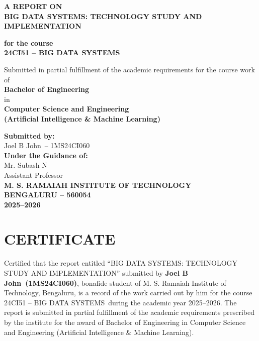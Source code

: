 \documentclass[12pt,a4paper]{report}
\newcommand{\ProjectTitle}{BIG DATA SYSTEMS: TECHNOLOGY STUDY AND IMPLEMENTATION}
\newcommand{\CourseCode}{24CI51 -- BIG DATA SYSTEMS}
\newcommand{\AcademicYear}{2025--2026}
\newcommand{\StudentOne}{Joel B John}
\newcommand{\USNOne}{1MS24CI060}
\newcommand{\GuideOne}{Mr. Subash N}
\newcommand{\GuideDesignation}{Assistant Professor}
\begin{document}
\begin{titlepage}
\centering
\thispagestyle{empty}

\vspace*{0.2cm}
{\bfseries\Large A REPORT ON\\[0.3cm]}
{\bfseries\LARGE \ProjectTitle\\[0.6cm]}

{\bfseries for the course\\[0.2cm]}
{\bfseries \CourseCode\\[0.8cm]}

Submitted in partial fulfillment of the academic requirements
for the course work of\\[0.2cm]
{\bfseries Bachelor of Engineering\\}
in\\
{\bfseries Computer Science and Engineering\\[0.2cm]}
{\bfseries (Artificial Intelligence \& Machine Learning)\\[0.8cm]}

{\bfseries Submitted by:\\[0.2cm]}
\StudentOne\ -- \USNOne\\[0.8cm]

{\bfseries Under the Guidance of:\\[0.2cm]}
\GuideOne\\
\GuideDesignation\\[1.0cm]

{\bfseries M. S. RAMAIAH INSTITUTE OF TECHNOLOGY\\}
{\bfseries BENGALURU -- 560054\\}
{\bfseries \AcademicYear}

\end{titlepage}

\setcounter{page}{1}

\chapter*{CERTIFICATE}

Certified that the report entitled ``\ProjectTitle'' submitted by
\textbf{\StudentOne\ (\USNOne)}, bonafide student of M. S. Ramaiah
Institute of Technology, Bengaluru, is a record of the work carried
out by him for the course \CourseCode\ during the academic year
\AcademicYear. The report is submitted in partial fulfillment of the
academic requirements prescribed by the institute for the award of Bachelor of Engineering in Computer Science and Engineering (Artificial Intelligence \& Machine Learning).
\end{document}
